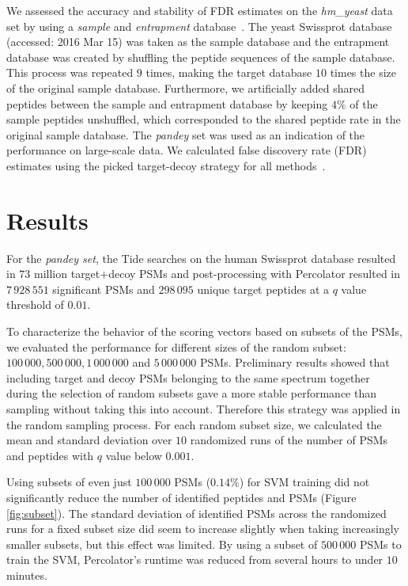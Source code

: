 \documentclass{article}
\begin{document}
We assessed the accuracy and stability of FDR estimates on the {\em
hm\_yeast} data set by using a {\em sample} and {\em entrapment}
database~\cite{granholm2013determining}. The yeast Swissprot database
(accessed: 2016 Mar 15) was taken as the sample database and the
entrapment database was created by shuffling the peptide sequences of
the sample database. This process was repeated $9$ times, making the
target database $10$ times the size of the original sample database.
Furthermore, we artificially added shared peptides between the sample
and entrapment database by keeping $4\%$ of the sample peptides
unshuffled, which corresponded to the shared peptide rate in the
original sample database. The {\em pandey} set was used as an
indication of the performance on large-scale data. We calculated false
discovery rate (FDR) estimates using the picked target-decoy strategy
for all methods~\cite{savitski2015scalable}.

\section*{Results}

For the {\em pandey set}, the Tide searches on the human Swissprot
database resulted in $73$ million target+decoy PSMs and
post-processing with Percolator resulted in $7\,928\,551$ significant
PSMs and $298\,095$ unique target peptides at a $q$ value threshold of
$0.01$.

To characterize the behavior of the scoring vectors based on subsets
of the PSMs, we evaluated the performance for different sizes of the
random subset: $100\,000, 500\,000, 1\,000\,000$ and $5\,000\,000$
PSMs. Preliminary results showed that including target and
decoy PSMs belonging to the same spectrum together during the
selection of random subsets gave a more stable performance than
sampling without taking this into account. Therefore this strategy was
applied in the random sampling process. For each random subset
size, we calculated the mean and standard deviation over $10$
randomized runs of the number of PSMs and peptides with $q$ value
below $0.001$.

Using subsets of even just $100\,000$ PSMs ($0.14\%$) for SVM
training did not significantly reduce the number of identified
peptides and PSMs (Figure \ref{fig:subset}). The standard deviation of
identified PSMs across the randomized runs for a fixed subset size did
seem to increase slightly when taking increasingly smaller subsets,
but this effect was limited. By using a subset of $500\,000$ PSMs to
train the SVM, Percolator’s runtime was reduced from several hours to
under $10$ minutes.
\end{document}
